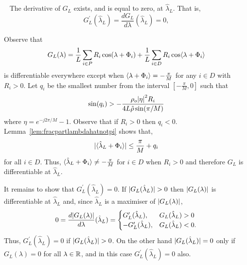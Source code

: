 \documentclass[journal]{IEEEtran}
\begin{document}
\begin{lemma}~\label{lem:diffatlambdaL}
The derivative of $G_L$ exists, and is equal to zero, at $\hat{\lambda}_L$.  That is,
\[
G_L^\prime(\hat{\lambda}_L) = \frac{d G_L}{d \lambda}(\hat{\lambda}_L) = 0,
\]
\end{lemma}
\begin{IEEEproof}
Observe that 
\[
G_L(\lambda) = \frac{1}{L}\sum_{i \in P} R_i \cos(\lambda + \Phi_i) + \frac{1}{L} \sum_{i \in D} R_i \cos\langle \lambda + \Phi_i \rangle
\] 
is differentiable everywhere except when $\left\langle \lambda + \Phi_i \right\rangle = -\tfrac{\pi}{M}$ for any $i \in D$ with $R_i > 0$.  Let $q_i$ be the smallest number from the interval $[-\tfrac{\pi}{M}, 0]$ such that
\[
 \sin(q_i) > -\frac{\rho_o {\vert \eta \vert}^2 R_i}{4 L \hat{\rho} \sin(\pi/M)}
\]
where $\eta = e^{-j2\pi/M} - 1$.  Observe that if $R_i > 0$ then $q_i < 0$.  Lemma~\ref{lem:fracpartlambdahatnotpi} shows that,
\[
{\vert \langle \hat{\lambda}_L + \Phi_i \rangle \vert} \leq \frac{\pi}{M} + q_i
\]
for all $i \in D$.  Thus, $\langle \hat{\lambda}_L + \Phi_i \rangle \neq -\tfrac{\pi}{M}$ for $i \in D$ when $R_i > 0$ and therefore $G_L$ is differentiable at $\hat{\lambda}_L$.  

It remains to show that $G_L^\prime(\hat{\lambda}_L) = 0$.  If ${\vert G_L(\hat{\lambda}_L) \vert} > 0$ then ${\vert G_L(\lambda) \vert}$ is differentiable at $\hat{\lambda}_L$ and, since $\hat{\lambda}_L$ is a maximiser of ${\vert G_L(\lambda) \vert}$,
\[
0 = \frac{d {\vert G_L(\lambda) \vert}}{d \lambda}(\hat{\lambda}_L) = \begin{cases} 
G_L^\prime(\hat{\lambda}_L), & G_L(\hat{\lambda}_L) > 0\\
-G_L^\prime(\hat{\lambda}_L), & G_L(\hat{\lambda}_L) < 0.
\end{cases}
\]
Thus, $G_L^\prime(\hat{\lambda}_L) = 0$ if ${\vert G_L(\hat{\lambda}_L) \vert} > 0$.  On the other hand ${\vert G_L(\hat{\lambda}_L) \vert} = 0$ only if $G_L(\lambda) = 0$ for all $\lambda \in {\mathbb R}$, and in this case $G_L^\prime(\hat{\lambda}_L) = 0$ also. 
\end{IEEEproof}
\end{document}
